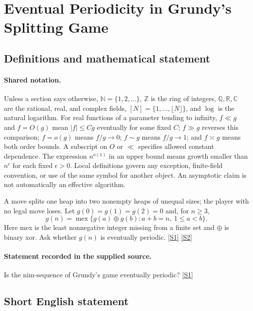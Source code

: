\documentclass[11pt,a4paper]{article}
\newcommand{\N}{\mathbb{N}}
\newcommand{\Z}{\mathbb{Z}}
\newcommand{\Q}{\mathbb{Q}}
\newcommand{\R}{\mathbb{R}}
\newcommand{\C}{\mathbb{C}}
\newcommand{\sref}[2]{\hyperlink{source:#1:#2}{[S#2]}}
\begin{document}
\section{Eventual Periodicity in Grundy’s Splitting Game}\label{statement}


\subsection{Definitions and mathematical statement}

\paragraph{Shared notation.}Unless a section says otherwise, $\N=\{1,2,\ldots\}$,
$\Z$ is the ring of integers, $\Q,\R,\C$ are the rational, real, and complex
fields, $[N]=\{1,\ldots,\lfloor N\rfloor\}$, and $\log$ is the natural
logarithm. For real functions of a parameter tending to infinity,
$f\ll g$ and $f=O(g)$ mean $|f|\leq Cg$ eventually for some fixed $C$;
$f\gg g$ reverses this comparison; $f=o(g)$ means $f/g\to0$;
$f\sim g$ means $f/g\to1$; and $f\asymp g$ means both order bounds.
A subscript on $O$ or $\ll$ specifies allowed constant dependence.
The expression $n^{o(1)}$ in an upper bound means growth smaller than
$n^\epsilon$ for each fixed $\epsilon>0$. Local definitions govern any
exception, finite-field convention, or use of the same symbol for another
object. An asymptotic claim is not automatically an effective algorithm.



A move splits one heap into two nonempty heaps of unequal sizes; the player with no legal move loses. Let $g(0)=g(1)=g(2)=0$ and, for $n\geq3$,
\[g(n)=\operatorname{mex}\{g(a)\oplus g(b):a+b=n,\ 1\leq a<b\}.\]
Here mex is the least nonnegative integer missing from a finite set and $\oplus$ is binary xor. Ask whether $g(n)$ is eventually periodic. \sref{statement}{1} \sref{statement}{2}

\paragraph{Statement recorded in the supplied source.}
Is the nim-sequence of Grundy's game eventually periodic? \sref{statement}{1}

\subsection{Short English statement}
\end{document}
